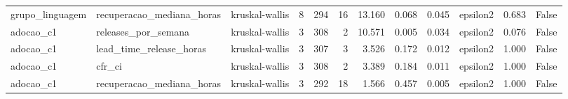 \begin{tabular}{lllrrrrrrlrr}
grupo_linguagem & recuperacao_mediana_horas & kruskal-wallis & 8 & 294 & 16 & 13.160 & 0.068 & 0.045 & epsilon2 & 0.683 & False \\
adocao_c1 & releases_por_semana & kruskal-wallis & 3 & 308 & 2 & 10.571 & 0.005 & 0.034 & epsilon2 & 0.076 & False \\
adocao_c1 & lead_time_release_horas & kruskal-wallis & 3 & 307 & 3 & 3.526 & 0.172 & 0.012 & epsilon2 & 1.000 & False \\
adocao_c1 & cfr_ci & kruskal-wallis & 3 & 308 & 2 & 3.389 & 0.184 & 0.011 & epsilon2 & 1.000 & False \\
adocao_c1 & recuperacao_mediana_horas & kruskal-wallis & 3 & 292 & 18 & 1.566 & 0.457 & 0.005 & epsilon2 & 1.000 & False \\
\bottomrule
\end{tabular}

